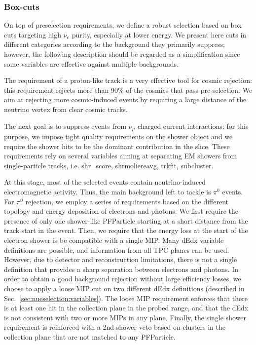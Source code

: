 \documentclass[a4paper]{article}
\begin{document}
\subsubsection{Box-cuts}

On top of preselection requirements, we define a robust selection based on box cuts targeting high $\nu_e$ purity, especially at lower energy.
We present here cuts in different categories according to the background they primarily suppress; however,  the following description should be regarded as a simplification since some variables are effective against multiple backgrounds.


The requirement of a proton-like track is a very effective tool for cosmic rejection: this requirement rejects more than 90\% of the cosmics that pass pre-selection. We aim at rejecting more cosmic-induced events by requiring a large distance of the neutrino vertex from clear cosmic tracks. 

The next goal is to suppress events from $\nu_\mu$ charged current interactions; for this purpose, we impose tight quality requirements on the shower object and we require the shower hits to be the dominant contribution in the slice. These requirements rely on several variables aiming at separating EM showers from single-particle tracks, i.e. shr\_score, shrmoliereavg, trkfit, subcluster. 

At this stage, most of the selected events contain neutrino-induced electromagnetic activity. Thus, the main background left to tackle is  $\pi^0$ events. For $\pi^0$ rejection, we employ a series of requirements based on the different topology and energy deposition of electrons and photons. We first require the presence of only one shower-like PFParticle starting at a short distance from the track start in the event. Then, we require that the energy loss at the start of the electron shower is be compatible with a single MIP. Many dEdx variable definitions are possible, and information from all TPC planes can be used. However, due to detector and reconstruction limitations, there is not a single definition that provides a sharp separation between electrons and photons. In order to obtain a good background rejection without large efficiency losses, we choose to apply a loose MIP cut on two different dEdx definitions (described in Sec.~\ref{sec:nueselection:variables}). The loose MIP requirement enforces that there is at least one hit in the collection plane in the probed range, and that the dEdx is not consistent with two or more MIPs in any plane. Finally, the single shower requirement is reinforced with a 2nd shower veto based on clusters in the collection plane that are not matched to any PFParticle.
\end{document}
